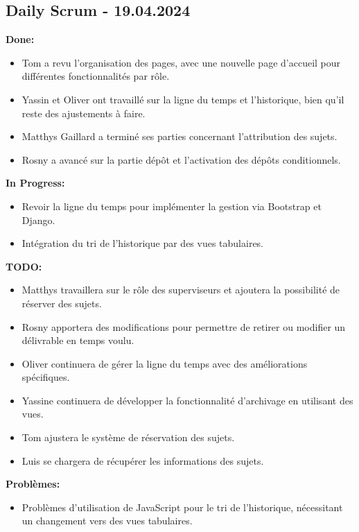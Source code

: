 \documentclass[11pt]{article}
\begin{document}
\subsection*{{\color{navy}Daily Scrum - 19.04.2024}}

\textbf{Done:}
\begin{itemize}
  \item Tom a revu l'organisation des pages, avec une nouvelle page d'accueil pour différentes fonctionnalités par rôle.
  \item Yassin et Oliver ont travaillé sur la ligne du temps et l'historique, bien qu'il reste des ajustements à faire.
  \item Matthys Gaillard a terminé ses parties concernant l'attribution des sujets.
  \item Rosny a avancé sur la partie dépôt et l'activation des dépôts conditionnels.
\end{itemize}

\textbf{In Progress:}
\begin{itemize}
  \item Revoir la ligne du temps pour implémenter la gestion via Bootstrap et Django.
  \item Intégration du tri de l'historique par des vues tabulaires.
\end{itemize}

\textbf{TODO:}
\begin{itemize}
  \item Matthys travaillera sur le rôle des superviseurs et ajoutera la possibilité de réserver des sujets.
  \item Rosny apportera des modifications pour permettre de retirer ou modifier un délivrable en temps voulu.
  \item Oliver continuera de gérer la ligne du temps avec des améliorations spécifiques.
  \item Yassine continuera de développer la fonctionnalité d'archivage en utilisant des vues.
  \item Tom ajustera le système de réservation des sujets.
  \item Luis se chargera de récupérer les informations des sujets.
\end{itemize}

\textbf{Problèmes:}
\begin{itemize}
  \item Problèmes d'utilisation de JavaScript pour le tri de l'historique, nécessitant un changement vers des vues tabulaires.
\end{itemize}
\end{document}
